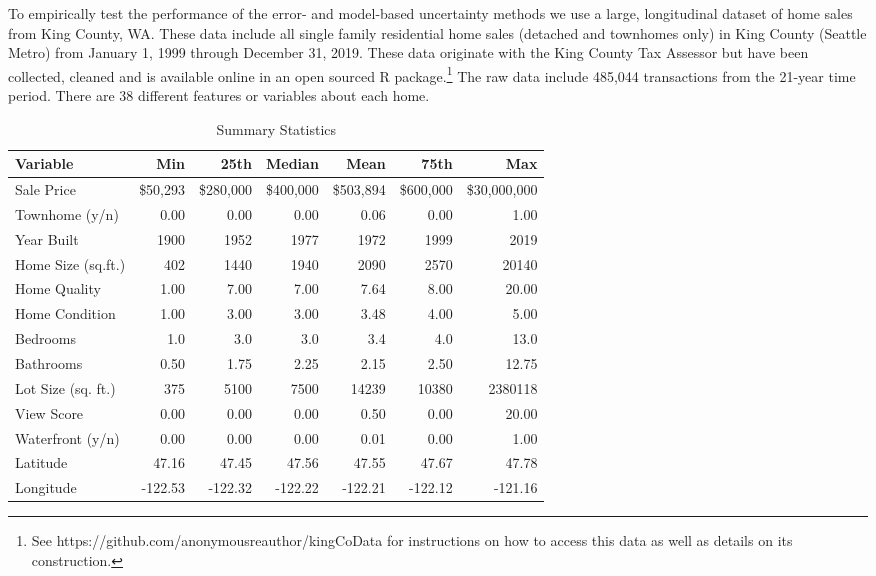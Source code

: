 \documentclass[colTwo]{anon}
\theoremstyle{definition}
\begin{document}
To empirically test the performance of the error- and model-based uncertainty methods we use a large, longitudinal dataset of home sales from King County, WA.  These data include all single family residential home sales (detached and townhomes only) in King County (Seattle Metro) from January 1, 1999 through December 31, 2019. These data originate with the King County Tax Assessor but have been collected, cleaned and is available online in an open sourced R package.\footnote{See https://github.com/anonymousreauthor/kingCoData for instructions on how to access this data as well as details on its construction.} The raw data include 485,044 transactions from the 21-year time period.  There are 38 different features or variables about each home. 

\begin{table*}[h!]
\centering
\begin{tabular}{l|r|r|r|r|r|r}
\hline
\textbf{Variable} & \textbf{Min} & \textbf{25th} & \textbf{Median} & \textbf{Mean} & \textbf{75th} & \textbf{Max}\\
\hline
Sale Price & \$50,293 & \$280,000 & \$400,000 & \$503,894 & \$600,000 & \$30,000,000\\
Townhome (y/n) & 0.00 & 0.00 & 0.00 & 0.06 & 0.00 & 1.00 \\
Year Built & 1900 & 1952 & 1977 & 1972 & 1999 & 2019\\
Home Size (sq.ft.) & 402 & 1440 & 1940 & 2090 & 2570 & 20140\\
Home Quality & 1.00 & 7.00 & 7.00 & 7.64 & 8.00 & 20.00\\
Home Condition & 1.00 & 3.00 & 3.00 & 3.48 & 4.00 & 5.00\\
Bedrooms & 1.0 & 3.0 & 3.0 & 3.4 & 4.0 & 13.0\\
Bathrooms & 0.50 & 1.75 & 2.25 & 2.15 & 2.50 & 12.75\\
Lot Size (sq. ft.) & 375 & 5100 & 7500 & 14239 & 10380 & 2380118\\
View Score & 0.00 & 0.00 & 0.00 & 0.50 & 0.00 & 20.00\\
Waterfront (y/n) & 0.00 & 0.00 & 0.00 & 0.01 & 0.00 & 1.00\\
Latitude & 47.16 & 47.45 & 47.56 & 47.55 & 47.67 & 47.78\\
Longitude & -122.53 & -122.32 & -122.22 & -122.21 & -122.12 & -121.16\\
\hline
\end{tabular}
\caption{Summary Statistics}
\label{table:3}
\end{table*}
\end{document}
